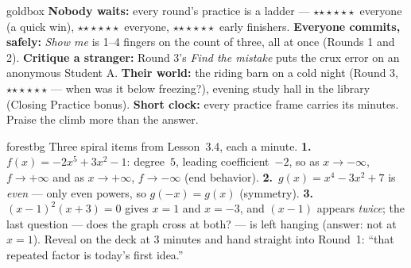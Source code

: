 \documentclass[10pt]{article}
\newcommand{\rung}[1]{{\color{goldacc}\ifcase#1\or$\star$\or$\star\star$\or$\star\star\star$\fi}}
\begin{document}
\begin{skillbox}{goldbox}
\textbf{Nobody waits:} every round's practice is a ladder --- \rung1\ everyone (a quick win),
\rung2\ everyone, \rung3\ early finishers. \textbf{Everyone commits, safely:} \emph{Show me} is
1--4 fingers on the count of three, all at once (Rounds 1 and 2). \textbf{Critique a stranger:}
Round 3's \emph{Find the mistake} puts the crux error on an anonymous Student A.
\textbf{Their world:} the riding barn on a cold night (Round 3, \rung3 --- when was it below
freezing?), evening study hall in the library (Closing Practice bonus). \textbf{Short
clock:} every practice frame carries its minutes. Praise the climb more than the answer.
\end{skillbox}

\begin{skillbox}{forestbg}
Three spiral items from Lesson~3.4, each a minute. \textbf{1.}~$f(x)=-2x^5+3x^2-1$: degree~$5$,
leading coefficient~$-2$, so as $x\to-\infty$, $f\to+\infty$ and as $x\to+\infty$,
$f\to-\infty$ (end behavior). \textbf{2.}~$g(x)=x^4-3x^2+7$ is \emph{even} --- only even powers,
so $g(-x)=g(x)$ (symmetry). \textbf{3.}~$(x-1)^2(x+3)=0$ gives $x=1$ and $x=-3$, and $(x-1)$
appears \emph{twice}; the last question --- does the graph cross at both? --- is left hanging
(answer: not at $x=1$). Reveal on the deck at 3 minutes and hand straight into Round~1: ``that
repeated factor is today's first idea.''
\end{skillbox}
\end{document}

